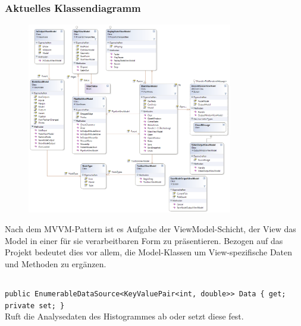 \subsubsection*{Aktuelles Klassendiagramm}
\begin{figure}[h!]
\begin{center}
\includegraphics[width=0.8\textwidth]{classdiagram/viewmodel.png}
\end{center}
\end{figure}
Nach dem MVVM-Pattern ist es Aufgabe der ViewModel-Schicht, der View das Model in einer für sie verarbeitbaren Form zu präsentieren. Bezogen auf das Projekt bedeutet dies vor allem, die Model-Klassen um View-spezifische Daten und Methoden zu ergänzen.
\newpage

\subsection{}

\paragraph{}
\begin{itemize}
	\add \verb!public EnumerableDataSource<KeyValuePair<int, double>> Data { get; private set; }! \\
	Ruft die Analysedaten des Histogrammes ab oder setzt diese fest.
\end{itemize}

